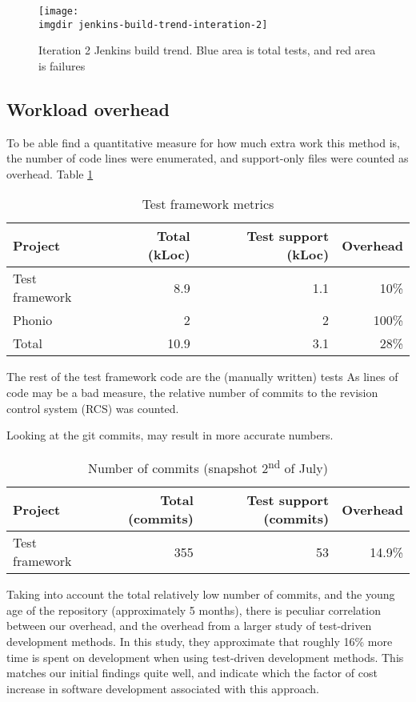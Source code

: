 \begin{figure}[!hbpt]
\centering
\texttt{[image: \\imgdir jenkins-build-trend-interation-2]}
\caption{Iteration 2 Jenkins build trend. Blue area is total tests, and red area is failures}
\label{fig:jenkins-build-trend-interation-2}
\end{figure}

\subsection{Workload overhead}
To be able find a quantitative measure for how much extra work this method is, the number of code lines were enumerated, and support-only files were counted as overhead. Table \ref{tab:loc-metrics}
\begin{table}[!htbp]
\begin{tabular}{ | l | r | r | r |}
   \hline
   Project        & Total (kLoc) & Test support (kLoc) & Overhead \\ \hline
   Test framework & 8.9          & 1.1                 & 10\%     \\
   Phonio         & 2            & 2                   & 100\%    \\
   \hline
   \hline
   Total          & 10.9         & 3.1                 & 28\%     \\
   \hline
\end{tabular}
\caption{Test framework metrics}
\label{tab:loc-metrics}
\end{table}
The rest of the test framework code are the (manually written) tests
As lines of code may be a bad measure\cite{fraser2013does}, the relative number of commits to the revision control system (RCS) was counted. 

Looking at the git commits, may result in more accurate numbers.

\begin{table}[!htbp]
\begin{tabular}{ | l | r | r | r |}
   \hline
   Project        & Total (commits) & Test support (commits) & Overhead \\ \hline
   Test framework & 355             & 53                     & 14.9\%     \\
   \hline
\end{tabular}
\caption{Number of commits (snapshot 2\textsuperscript{nd} of July)}
\label{tab:metrics-commit-count}
\end{table}
Taking into account the total relatively low number of commits, and the young age of the repository (approximately 5 months), there is peculiar correlation between our overhead, and the overhead from a larger study of test-driven development methods\cite{george2003}. In this study, they approximate that roughly 16\% more time is spent on development when using test-driven development methods. This matches our initial findings quite well, and indicate which the factor of cost increase in software development associated with this approach.

